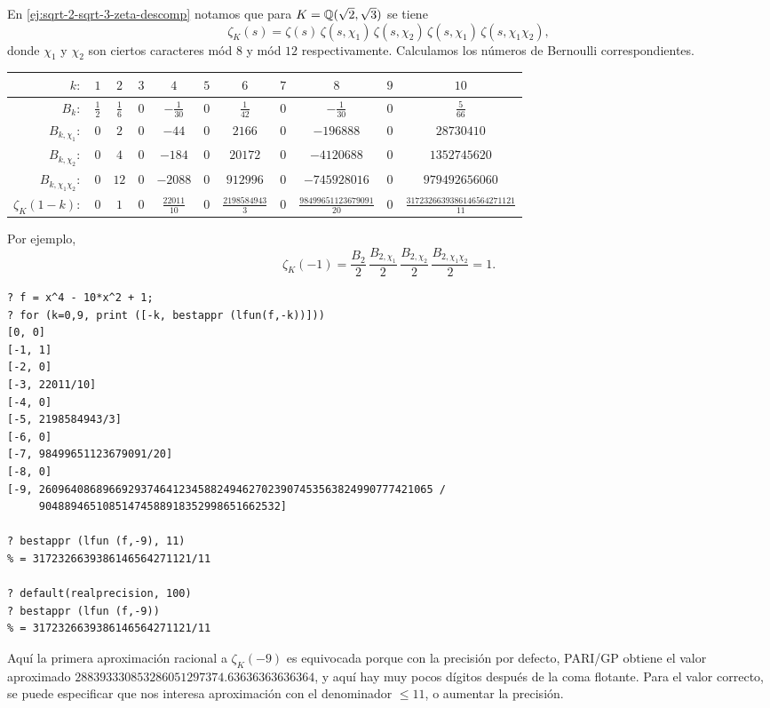 \begin{ejemplo}
  En \ref{ej:sqrt-2-sqrt-3-zeta-descomp} notamos que para
  $K = \mathbb{Q} (\sqrt{2},\sqrt{3})$ se tiene
  $$\zeta_K (s) = \zeta (s)\,\zeta (s,\chi_1)\,\zeta (s,\chi_2)\,\zeta (s,\chi_1)\,\zeta (s,\chi_1\chi_2),$$
  donde $\chi_1$ y $\chi_2$ son ciertos caracteres mód $8$ y mód $12$
  respectivamente. Calculamos los números de Bernoulli correspondientes.

  \begin{center}
    \renewcommand{\arraystretch}{1.5}
    \begin{tabular}{rcccccccccc}
      \hline
      $k\colon$ & $1$ & $2$ & $3$ & $4$ & $5$ & $6$ & $7$ & $8$ & $9$ & $10$ \\
      \hline
      $B_k\colon$ & $\frac{1}{2}$ & $\frac{1}{6}$ & $0$ & $-\frac{1}{30}$ & $0$ & $\frac{1}{42}$ & $0$ & $-\frac{1}{30}$ & $0$ & $\frac{5}{66}$ \\
      \hline
      $B_{k,\chi_1}\colon$ & $0$ & $2$ & $0$ & $-44$ & $0$ & $2166$ & $0$ & $-196888$ & $0$ & $28730410$ \\
      \hline
      $B_{k,\chi_2}\colon$ & $0$ & $4$ & $0$ & $-184$ & $0$ & $20172$ & $0$ & $-4120688$ & $0$ & $1352745620$ \\
      \hline
      $B_{k,\chi_1 \chi_2}\colon$ & $0$ & $12$ & $0$ & $-2088$ & $0$ & $912996$ & $0$ & $-745928016$ & $0$ & $979492656060$ \\
      \hline
      $\zeta_K (1-k)\colon$ & $0$ & $1$ & $0$ & $\frac{22011}{10}$ & $0$ & $\frac{2198584943}{3}$ & $0$ & $\frac{98499651123679091}{20}$ & $0$ & $\frac{3172326639386146564271121}{11}$ \\
      \hline
    \end{tabular}
  \end{center}

  Por ejemplo,
  $$\zeta_K (-1) = \frac{B_2}{2}\,\frac{B_{2,\chi_1}}{2}\,\frac{B_{2,\chi_2}}{2}\,\frac{B_{2,\chi_1\chi_2}}{2} = 1.$$

  \begin{shaded}
\begin{verbatim}
? f = x^4 - 10*x^2 + 1;
? for (k=0,9, print ([-k, bestappr (lfun(f,-k))]))
[0, 0]
[-1, 1]
[-2, 0]
[-3, 22011/10]
[-4, 0]
[-5, 2198584943/3]
[-6, 0]
[-7, 98499651123679091/20]
[-8, 0]
[-9, 26096408689669293746412345882494627023907453563824990777421065 /
     90488946510851474588918352998651662532]

? bestappr (lfun (f,-9), 11)
% = 3172326639386146564271121/11

? default(realprecision, 100)
? bestappr (lfun (f,-9))
% = 3172326639386146564271121/11
\end{verbatim}
\end{shaded}

  Aquí la primera aproximación racional a $\zeta_K (-9)$ es equivocada porque
  con la precisión por defecto, PARI/GP obtiene el valor aproximado
  $288393330853286051297374.63636363636364$, y aquí hay muy pocos dígitos
  después de la coma flotante. Para el valor correcto, se puede especificar
  que nos interesa aproximación con el denominador $\le 11$, o aumentar
  la precisión.
\end{ejemplo}

